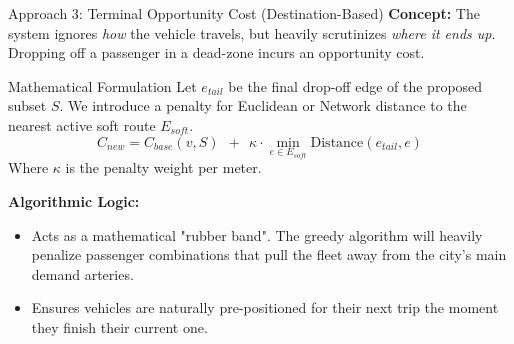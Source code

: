 \documentclass[aspectratio=169]{beamer}
\begin{document}
\begin{frame}{Approach 3: Terminal Opportunity Cost (Destination-Based)}
  \textbf{Concept:} The system ignores \textit{how} the vehicle travels, but heavily scrutinizes \textit{where it ends up}. Dropping off a passenger in a dead-zone incurs an opportunity cost.
  
  \vspace{0.3cm}
  \begin{block}{Mathematical Formulation}
  Let $e_{tail}$ be the final drop-off edge of the proposed subset $S$. We introduce a penalty for Euclidean or Network distance to the nearest active soft route $E_{soft}$.
  \[ C_{new} = C_{base}(v, S) \textbf{ } \mathbf{+} \textbf{ } \kappa \cdot \min_{e \in E_{soft}} \text{Distance}(e_{tail}, e) \]
  Where $\kappa$ is the penalty weight per meter.
  \end{block}
  
  \vspace{0.3cm}
  \textbf{Algorithmic Logic:}
  \begin{itemize}
      \item Acts as a mathematical "rubber band". The greedy algorithm will heavily penalize passenger combinations that pull the fleet away from the city's main demand arteries.
      \item Ensures vehicles are naturally pre-positioned for their next trip the moment they finish their current one.
  \end{itemize}
\end{frame}
\end{document}
